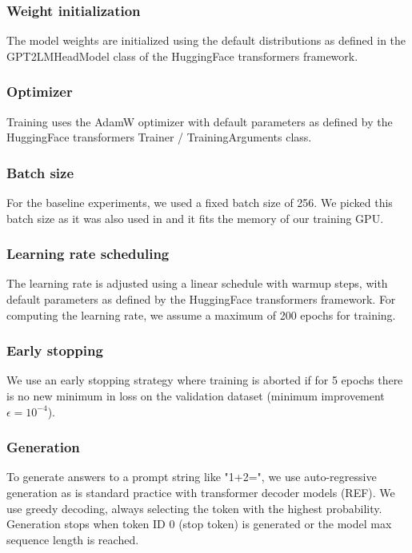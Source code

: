 \subsubsection{Weight initialization}

The model weights are initialized using the default distributions as defined in the GPT2LMHeadModel class of the HuggingFace transformers framework.

\subsubsection{Optimizer}

Training uses the AdamW optimizer with default parameters as defined by the HuggingFace transformers Trainer / TrainingArguments class.

\subsubsection{Batch size}
\label{expsetup:batchsize}

For the baseline experiments, we used a fixed batch size of 256. We picked this batch size as it was also used in \cite{teaching} and it fits the memory of our training GPU.

\subsubsection{Learning rate scheduling}
\label{expsetup:learnrate}

The learning rate is adjusted using a linear schedule with warmup steps, with default parameters as defined by the HuggingFace transformers framework.
For computing the learning rate, we assume a maximum of 200 epochs for training.

\subsubsection{Early stopping}
\label{early_stopping}

We use an early stopping strategy where training is aborted if for 5 epochs there is no new minimum in loss on the validation dataset (minimum improvement $\epsilon=10^{-4}$).

\subsubsection{Generation}

To generate answers to a prompt string like "1+2=", we use auto-regressive generation as is standard practice with transformer decoder models (REF). We use greedy decoding, always selecting the token with the highest probability. Generation stops when token ID 0 (stop token) is generated or the model max sequence length is reached.
\label{model_generation}

